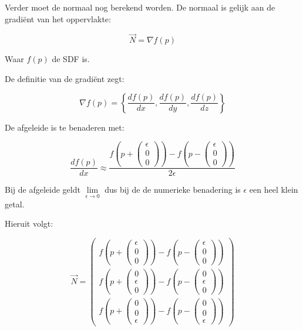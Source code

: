 \documentclass[12pt, a4paper]{article}
\begin{document}
Verder moet de normaal nog berekend worden. De normaal is gelijk aan de gradiënt van het oppervlakte:

\[\vec{N} = \nabla f(p)\]

Waar $f(p)$ de SDF is.

De definitie van de gradiënt zegt:

\[\nabla f(p)=\left\{\frac{df(p)}{dx},\frac{df(p)}{dy},\frac{df(p)}{dz}\right\}\]

De afgeleide is te benaderen met:

\[\frac{df(p)}{dx}\approx\frac{f\left(p+\begin{pmatrix} \epsilon \\ 0 \\ 0 \end{pmatrix}\right)-f\left(p-\begin{pmatrix} \epsilon \\ 0 \\ 0 \end{pmatrix}\right)}{2\epsilon}\]

Bij de afgeleide geldt $\lim\limits_{\epsilon \to 0}$ dus bij de de numerieke benadering is $\epsilon$ een heel klein getal.

Hieruit volgt:

\[
\vec{N}=\begin{pmatrix} 
f\left(p+\begin{pmatrix} \epsilon \\ 0 \\ 0 \end{pmatrix}\right)-f\left(p-\begin{pmatrix} \epsilon \\ 0 \\ 0 \end{pmatrix}\right) \\
f\left(p+\begin{pmatrix} 0 \\ \epsilon \\ 0 \end{pmatrix}\right)-f\left(p-\begin{pmatrix} 0 \\ \epsilon \\ 0 \end{pmatrix}\right) \\
f\left(p+\begin{pmatrix} 0 \\ 0 \\ \epsilon \end{pmatrix}\right)-f\left(p-\begin{pmatrix} 0 \\ 0 \\ \epsilon \end{pmatrix}\right)
\end{pmatrix}\]
\end{document}
